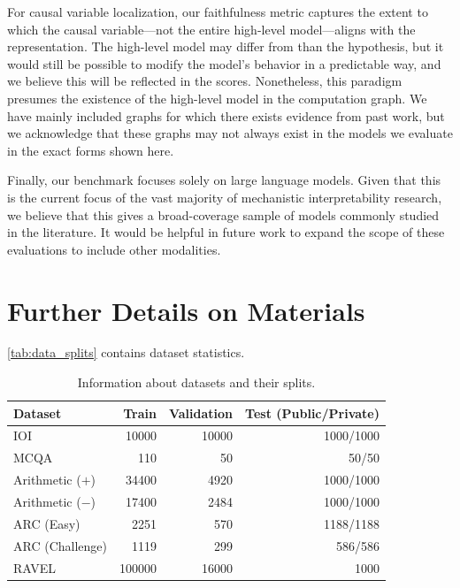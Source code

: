 \documentclass{article}
\theoremstyle{plain}
\theoremstyle{definition}
\theoremstyle{remark}
\begin{document}
For causal variable localization, our faithfulness metric captures the extent to which the causal variable---not the entire high-level model---aligns with the representation. The high-level model may differ from than the hypothesis, but it would still be possible to modify the model's behavior in a predictable way, and we believe this will be reflected in the scores. Nonetheless, this paradigm presumes the existence of the high-level model in the computation graph. We have mainly included graphs for which there exists evidence from past work, but we acknowledge that these graphs may not always exist in the models we evaluate in the exact forms shown here.

Finally, our benchmark focuses solely on large language models. Given that this is the current focus of the vast majority of mechanistic interpretability research, we believe that this gives a broad-coverage sample of models commonly studied in the literature. It would be helpful in future work to expand the scope of these evaluations to include other modalities.

\section{Further Details on Materials}
\label{app:data}

\autoref{tab:data_splits} contains dataset statistics.

\begin{table}[h]
    \centering
    \caption{Information about datasets and their splits.}
    \begin{tabular}{lrrr}
    \toprule
    Dataset & Train & Validation & Test (Public/Private)\\
    \midrule
    IOI & 10000 & 10000 & 1000/1000\\
    MCQA & 110 & 50 & 50/50\\
    Arithmetic ($+$) & 34400 & 4920 & 1000/1000 \\
    Arithmetic ($-$) & 17400 & 2484 & 1000/1000 \\
    ARC (Easy) & 2251 & 570 & 1188/1188\\
    ARC (Challenge) & 1119 & 299 & 586/586 \\
    RAVEL & 100000 & 16000 & 1000 \\
    \bottomrule
    \end{tabular}
    \label{tab:data_splits}
\end{table}
\end{document}
